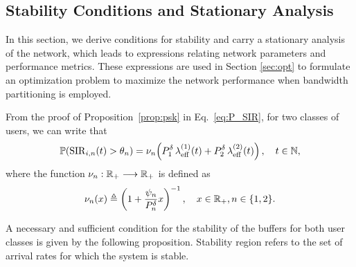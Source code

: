 \subsection{Stability Conditions and Stationary Analysis}
\label{sec:stab}

In this section, we derive conditions for stability and carry a stationary analysis of the network, which leads to expressions relating network parameters and performance metrics. These expressions are used in Section \ref{sec:opt} to formulate an optimization problem to maximize the network performance when bandwidth partitioning is employed. 


From the proof of Proposition~\ref{prop:psk} in Eq.~\eqref{eq:P_SIR}, for two classes of users, we can write that%
\begin{equation} \label{eq:P_SIR_M}
	{\mathbb P}(\mathrm{SIR}_{i,n}(t) > \theta_n) 
    	= \nu_n\!\left( P_1^\delta\,\lambda_\mathrm{eff}^{(1)}(t)
        	+ P_2^\delta\,\lambda_\mathrm{eff}^{(2)}(t) \right), \quad t\in{\mathbb N},
\end{equation}
where the function ${\nu_n: {\mathbb R}_+ \longrightarrow {\mathbb R}_+}$ is defined as
\begin{equation}\label{defNu}
\nu_n(x) \triangleq \left(1+\frac{\psi_n}{P_n^\delta}x\right)^{-1}, \quad x\in{\mathbb R}_+, n\in\{1,2\}.
\end{equation}

A necessary and sufficient condition for the stability of the buffers for both user classes is given by the following proposition.
%
%
Stability region refers to the set of arrival rates for which the system is stable.

